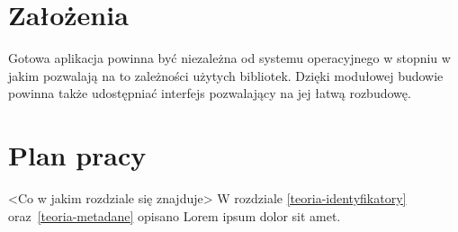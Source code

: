 \section{Założenia}
Gotowa aplikacja powinna być niezależna od systemu operacyjnego w stopniu w jakim pozwalają na to zależności użytych bibliotek. Dzięki modułowej budowie powinna także udostępniać interfejs pozwalający na jej łatwą rozbudowę.

\section{Plan pracy}
<Co w jakim rozdziale się znajduje>
W rozdziale \ref{teoria-identyfikatory} oraz~\ref{teoria-metadane} opisano Lorem ipsum dolor sit amet.

\clearpage
